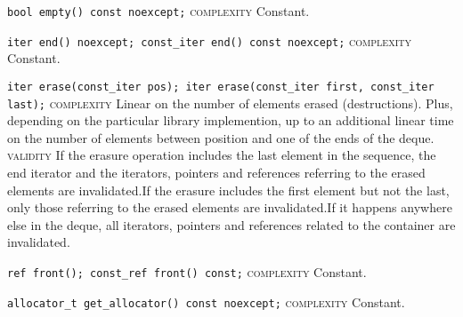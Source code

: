 \noindent{}\hspace*{0.25em}\lstinline[basicstyle=\ttfamily\color{cgreen}]{bool empty() const noexcept;} \textsc{complexity} Constant.\\\vspace{-0.6em}

\noindent{}\hspace*{0.25em}\lstinline[basicstyle=\ttfamily\color{cgreen}]{iter end() noexcept; const_iter end() const noexcept;} \textsc{complexity} Constant.\\\vspace{-0.6em}

\noindent{}\hspace*{0.25em}\lstinline[basicstyle=\ttfamily\color{corange}]{iter erase(const_iter pos); iter erase(const_iter first, const_iter last);} \textsc{complexity} Linear on the number of elements erased (destructions). Plus, depending on the particular library implemention, up to an additional linear time on the number of elements between position and one of the ends of the deque. \textsc{validity} If the erasure operation includes the last element in the sequence, the end iterator and the iterators, pointers and references referring to the erased elements are invalidated.If the erasure includes the first element but not the last, only those referring to the erased elements are invalidated.If it happens anywhere else in the deque, all iterators, pointers and references related to the container are invalidated.\\\vspace{-0.6em}

\noindent{}\hspace*{0.25em}\lstinline[basicstyle=\ttfamily\color{cgreen}]{ref front(); const_ref front() const;} \textsc{complexity} Constant.\\\vspace{-0.6em}

\noindent{}\hspace*{0.25em}\lstinline[basicstyle=\ttfamily\color{cgreen}]{allocator_t get_allocator() const noexcept;} \textsc{complexity} Constant.\\\vspace{-0.6em}

